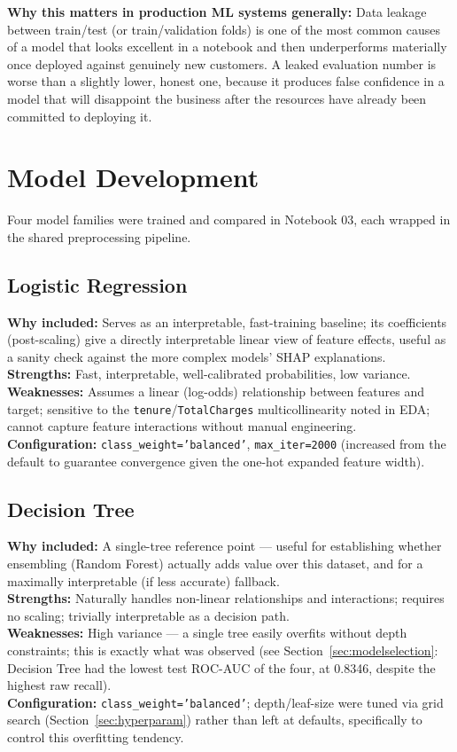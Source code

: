 \documentclass[11pt]{article}
\newcommand{\artifact}[1]{\texttt{\color{navy}#1}}
\begin{document}
\textbf{Why this matters in production ML systems generally:} Data leakage between train/test (or train/validation folds) is one of the most common causes of a model that looks excellent in a notebook and then underperforms materially once deployed against genuinely new customers. A leaked evaluation number is worse than a slightly lower, honest one, because it produces false confidence in a model that will disappoint the business after the resources have already been committed to deploying it.

\section{Model Development}

Four model families were trained and compared in Notebook 03, each wrapped in the shared preprocessing pipeline.

\subsection{Logistic Regression}
\textbf{Why included:} Serves as an interpretable, fast-training baseline; its coefficients (post-scaling) give a directly interpretable linear view of feature effects, useful as a sanity check against the more complex models' SHAP explanations.\\
\textbf{Strengths:} Fast, interpretable, well-calibrated probabilities, low variance.\\
\textbf{Weaknesses:} Assumes a linear (log-odds) relationship between features and target; sensitive to the \artifact{tenure}/\artifact{TotalCharges} multicollinearity noted in EDA; cannot capture feature interactions without manual engineering.\\
\textbf{Configuration:} \texttt{class\_weight='balanced'}, \texttt{max\_iter=2000} (increased from the default to guarantee convergence given the one-hot expanded feature width).

\subsection{Decision Tree}
\textbf{Why included:} A single-tree reference point --- useful for establishing whether ensembling (Random Forest) actually adds value over this dataset, and for a maximally interpretable (if less accurate) fallback.\\
\textbf{Strengths:} Naturally handles non-linear relationships and interactions; requires no scaling; trivially interpretable as a decision path.\\
\textbf{Weaknesses:} High variance --- a single tree easily overfits without depth constraints; this is exactly what was observed (see Section~\ref{sec:modelselection}: Decision Tree had the lowest test ROC-AUC of the four, at 0.8346, despite the highest raw recall).\\
\textbf{Configuration:} \texttt{class\_weight='balanced'}; depth/leaf-size were tuned via grid search (Section~\ref{sec:hyperparam}) rather than left at defaults, specifically to control this overfitting tendency.
\end{document}
